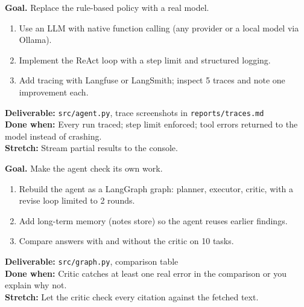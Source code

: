 \begin{tcolorbox}[enhanced,breakable,colback=white,colframe=sun,boxrule=0.8pt,arc=2pt,left=7pt,right=7pt,top=4pt,bottom=4pt,
  title={\bfseries Tuesday --- A ReAct agent on a real LLM\hfill\normalfont\small 3 h},coltitle=white,colbacktitle=sun,fonttitle=\small]
\textbf{Goal.} Replace the rule-based policy with a real model.
\begin{enumerate}[itemsep=1pt,topsep=2pt]
  \item Use an LLM with native function calling (any provider or a local model via Ollama).
  \item Implement the ReAct loop with a step limit and structured logging.
  \item Add tracing with Langfuse or LangSmith; inspect 5 traces and note one improvement each.
\end{enumerate}
\textbf{\color{dataC}Deliverable:} \texttt{src/agent.py}, trace screenshots in \texttt{reports/traces.md}\\
\textbf{\color{navy}Done when:} Every run traced; step limit enforced; tool errors returned to the model instead of crashing.\\
\textbf{\color{skillC}Stretch:} Stream partial results to the console.
\end{tcolorbox}

\begin{tcolorbox}[enhanced,breakable,colback=white,colframe=sun,boxrule=0.8pt,arc=2pt,left=7pt,right=7pt,top=4pt,bottom=4pt,
  title={\bfseries Wednesday --- Planner--executor--critic with memory\hfill\normalfont\small 3 h},coltitle=white,colbacktitle=sun,fonttitle=\small]
\textbf{Goal.} Make the agent check its own work.
\begin{enumerate}[itemsep=1pt,topsep=2pt]
  \item Rebuild the agent as a LangGraph graph: planner, executor, critic, with a revise loop limited to 2 rounds.
  \item Add long-term memory (notes store) so the agent reuses earlier findings.
  \item Compare answers with and without the critic on 10 tasks.
\end{enumerate}
\textbf{\color{dataC}Deliverable:} \texttt{src/graph.py}, comparison table\\
\textbf{\color{navy}Done when:} Critic catches at least one real error in the comparison or you explain why not.\\
\textbf{\color{skillC}Stretch:} Let the critic check every citation against the fetched text.
\end{tcolorbox}

